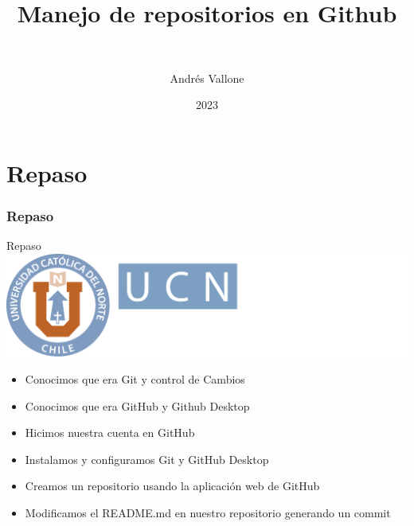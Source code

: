 \documentclass[12pt,a4paper,usenames,x11names,compress]{beamer}
\author[A. Vallone]{{\Large Andr\'{e}s Vallone} \inst{1}}
\institute{\inst{1}{\normalsize Escuela de Ciencias Empresariales}}
\title{\textcolor{DarkOrange1}{Manejo de repositorios en Github}}
\subtitle{\textcolor{white}{Taller de desarrollo de habilidades de investigaci\'{o}n\hfill 2023}}
\date{2023}
\begin{document}
{
\begin{frame}
\titlepage
\end{frame}
}

\part{Repaso}

\section{Repaso}
\begin{frame}{Repaso\hfill \includegraphics[scale=.1]{eciem.png}}
\begin{itemize}
\item Conocimos que era Git y control de Cambios
\item Conocimos que era GitHub y Github Desktop
\item Hicimos nuestra cuenta en GitHub 
\item Instalamos y configuramos Git y GitHub Desktop
\item Creamos un repositorio usando la aplicación web de GitHub
\item Modificamos el README.md en nuestro repositorio generando un commit
\end{itemize}
\end{frame}
\end{document}
